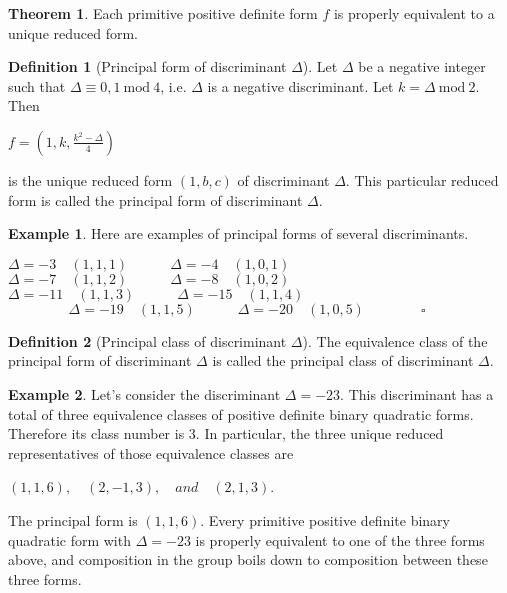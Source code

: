 \documentclass{article}
\theoremstyle{definition}
\newtheorem{definition}{Definition}[section]
\theoremstyle{theorem}
\newtheorem{theorem}{Theorem}[section]
\theoremstyle{example}
\newtheorem{example}{Example}[section]
\theoremstyle{corollary}
\begin{document}
\bigskip

\theoremstyle{theorem}
\begin{theorem}
Each primitive positive definite form \(f\) is properly equivalent to a unique reduced form.
\end{theorem}

\bigskip

\theoremstyle{definition}
\begin{definition}[Principal form of discriminant \(\Delta\)]
Let \(\Delta\) be a negative integer such that \(\Delta \equiv 0, 1 \ \textrm{mod} \ 4\), i.e. \(\Delta\) is a negative discriminant. Let \(k = \Delta \ \textrm{mod} \ 2\). Then
\begin{center}
\(f = \left(1, k, \frac{k^{2} - \Delta}{4}\right)\)
\end{center}
is the unique reduced form \((1, b, c)\) of discriminant \(\Delta\). This particular reduced form is called the principal form of discriminant \(\Delta\).
\end{definition}

\bigskip

\theoremstyle{example}
\begin{example}
Here are examples of principal forms of several discriminants.
\begin{center}
\(\Delta = -3 \quad (1, 1, 1) \quad \quad \quad \Delta = -4 \quad (1, 0, 1)\) \\
\(\Delta = -7 \quad (1, 1, 2) \quad \quad \quad \Delta = -8 \quad (1, 0, 2)\) \\
\(\Delta = -11 \quad (1, 1, 3) \quad \quad \quad \Delta = -15 \quad (1, 1, 4)\) \\
\(\phantom{\quad \quad \quad \quad \square} \Delta = -19 \quad (1, 1, 5) \quad \quad \quad \Delta = -20 \quad (1, 0, 5) \quad \quad \quad \quad \square\)
\end{center}
\end{example}

\bigskip

\theoremstyle{definition}
\begin{definition}[Principal class of discriminant \(\Delta\)]
The equivalence class of the principal form of discriminant \(\Delta\) is called the principal class of discriminant \(\Delta\).
\end{definition}

\bigskip

\theoremstyle{example}
\begin{example}
Let's consider the discriminant \(\Delta = -23\). This discriminant has a total of three equivalence classes of positive definite binary quadratic forms. Therefore its class number is 3. In particular, the three unique reduced representatives of those equivalence classes are
\begin{center}
\((1, 1, 6), \quad (2, -1, 3), \quad and \quad (2, 1, 3)\).
\end{center}
The principal form is \((1, 1, 6)\). Every primitive positive definite binary quadratic form with \(\Delta = -23\) is properly equivalent to one of the three forms above, and composition in the group boils down to composition between these three forms. \square
\end{example}
\end{document}
